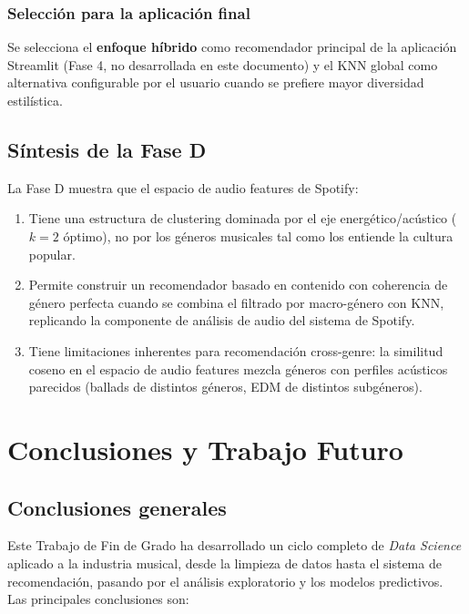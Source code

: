 \documentclass[12pt, a4paper, twoside]{book}
\theoremstyle{definition}
\begin{document}
\subsection{Selección para la aplicación final}

Se selecciona el \textbf{enfoque híbrido} como recomendador principal de la
aplicación Streamlit (Fase 4, no desarrollada en este documento) y el KNN global
como alternativa configurable por el usuario cuando se prefiere mayor diversidad
estilística.

\section{Síntesis de la Fase D}

La Fase D muestra que el espacio de audio features de Spotify:

\begin{enumerate}
  \item Tiene una estructura de clustering dominada por el eje
        energético/acústico ($k = 2$ óptimo), no por los géneros musicales
        tal como los entiende la cultura popular.
  \item Permite construir un recomendador basado en contenido con coherencia de
        género perfecta cuando se combina el filtrado por macro-género con KNN,
        replicando la componente de análisis de audio del sistema de Spotify.
  \item Tiene limitaciones inherentes para recomendación cross-genre: la
        similitud coseno en el espacio de audio features mezcla géneros con
        perfiles acústicos parecidos (ballads de distintos géneros, EDM de
        distintos subgéneros).
\end{enumerate}

\chapter{Conclusiones y Trabajo Futuro}

\section{Conclusiones generales}

Este Trabajo de Fin de Grado ha desarrollado un ciclo completo de \textit{Data
Science} aplicado a la industria musical, desde la limpieza de datos hasta el
sistema de recomendación, pasando por el análisis exploratorio y los modelos
predictivos. Las principales conclusiones son:
\end{document}
